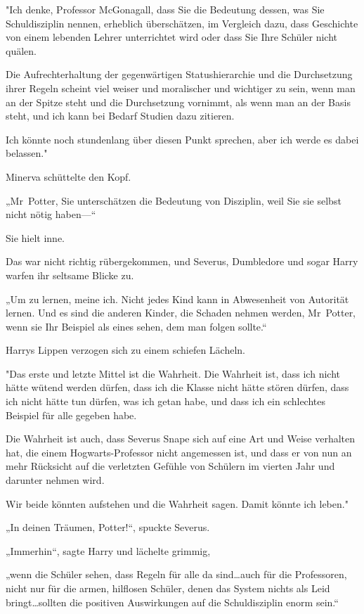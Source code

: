 {"Ich denke, Professor McGonagall, dass Sie die Bedeutung dessen, was Sie Schuldisziplin nennen, erheblich überschätzen, im Vergleich dazu, dass Geschichte von einem lebenden Lehrer unterrichtet wird oder dass Sie Ihre Schüler nicht quälen.

Die Aufrechterhaltung der gegenwärtigen Statushierarchie und die Durchsetzung ihrer Regeln scheint viel weiser und moralischer und wichtiger zu sein, wenn man an der Spitze steht und die Durchsetzung vornimmt, als wenn man an der Basis steht, und ich kann bei Bedarf Studien dazu zitieren.

Ich könnte noch stundenlang über diesen Punkt sprechen, aber ich werde es dabei belassen."

Minerva schüttelte den Kopf.

„Mr~Potter, Sie unterschätzen die Bedeutung von Disziplin, weil Sie sie selbst nicht nötig haben—“

Sie hielt inne.

Das war nicht richtig rübergekommen, und Severus, Dumbledore und sogar Harry warfen ihr seltsame Blicke zu.

„Um zu lernen, meine ich. Nicht jedes Kind kann in Abwesenheit von Autorität lernen. Und es sind die anderen Kinder, die Schaden nehmen werden, Mr~Potter, wenn sie Ihr Beispiel als eines sehen, dem man folgen sollte.“

Harrys Lippen verzogen sich zu einem schiefen Lächeln.

"Das erste und letzte Mittel ist die Wahrheit. Die Wahrheit ist, dass ich nicht hätte wütend werden dürfen, dass ich die Klasse nicht hätte stören dürfen, dass ich nicht hätte tun dürfen, was ich getan habe, und dass ich ein schlechtes Beispiel für alle gegeben habe.

Die Wahrheit ist auch, dass Severus Snape sich auf eine Art und Weise verhalten hat, die einem Hogwarts-Professor nicht angemessen ist, und dass er von nun an mehr Rücksicht auf die verletzten Gefühle von Schülern im vierten Jahr und darunter nehmen wird.

Wir beide könnten aufstehen und die Wahrheit sagen. Damit könnte ich leben."

„In deinen Träumen, Potter!“, spuckte Severus.

„Immerhin“, sagte Harry und lächelte grimmig,

„wenn die Schüler sehen, dass Regeln für alle da sind…auch für die Professoren, nicht nur für die armen, hilflosen Schüler, denen das System nichts als Leid bringt…sollten die positiven Auswirkungen auf die Schuldisziplin enorm sein.“

}
